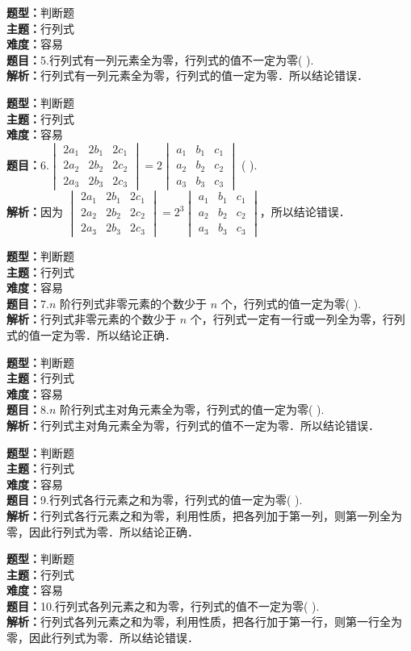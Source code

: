 \documentclass{ctexart}
\newenvironment{question}[5]{%
	\noindent\textbf{题型：}#1\\
	\textbf{主题：}#2\\
	\textbf{难度：}#3\\
	\textbf{题目：}#4\\
	\textbf{解析：}#5\\
	\vspace{1em}
}{}
\begin{document}
	\begin{question}
		{判断题}
		{行列式}
		{容易}
		{5.行列式有一列元素全为零，行列式的值不一定为零(  ).}
		{行列式有一列元素全为零，行列式的值一定为零．所以结论错误．}
	\end{question}
	
	\begin{question}
		{判断题}
		{行列式}
		{容易}
		{6.\(\begin{vmatrix}2 a_1 & 2 b_1 & 2 c_1 \\ 2 a_2 & 2 b_2 & 2 c_2 \\ 2 a_3 & 2 b_3 & 2 c_3\end{vmatrix}=2\begin{vmatrix}a_1 & b_1 & c_1 \\ a_2 & b_2 & c_2 \\ a_3 & b_3 & c_3\end{vmatrix}\) (  ).}
		{因为 \(\begin{vmatrix}2 a_1 & 2 b_1 & 2 c_1 \\ 2 a_2 & 2 b_2 & 2 c_2 \\ 2 a_3 & 2 b_3 & 2 c_3\end{vmatrix}=2^3\begin{vmatrix}a_1 & b_1 & c_1 \\ a_2 & b_2 & c_2 \\ a_3 & b_3 & c_3\end{vmatrix}\)，所以结论错误．}
	\end{question}
	
	\begin{question}
		{判断题}
		{行列式}
		{容易}
		{7.\(n\) 阶行列式非零元素的个数少于 \(n\) 个，行列式的值一定为零(  ).}
		{行列式非零元素的个数少于 \(n\) 个，行列式一定有一行或一列全为零，行列式的值一定为零．所以结论正确．}
	\end{question}
	
	\begin{question}
		{判断题}
		{行列式}
		{容易}
		{8.\(n\) 阶行列式主对角元素全为零，行列式的值一定为零(  ).}
		{行列式主对角元素全为零，行列式的值不一定为零．所以结论错误．}
	\end{question}
	
	\begin{question}
		{判断题}
		{行列式}
		{容易}
		{9.行列式各行元素之和为零，行列式的值一定为零(  ).}
		{行列式各行元素之和为零，利用性质，把各列加于第一列，则第一列全为零，因此行列式为零．所以结论正确．}
	\end{question}
	
	\begin{question}
		{判断题}
		{行列式}
		{容易}
		{10.行列式各列元素之和为零，行列式的值不一定为零(  ).}
		{行列式各列元素之和为零，利用性质，把各行加于第一行，则第一行全为零，因此行列式为零．所以结论错误．}
	\end{question}
	
\end{document}
